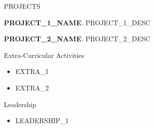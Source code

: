 \documentclass{resume}
\begin{document}
\begin{rSection}{PROJECTS}
\vspace{-1.25em}

\item \textbf{{{PROJECT_1_NAME}}}. {{{PROJECT_1_DESC}}} %

\item \textbf{{{PROJECT_2_NAME}}}. {{{PROJECT_2_DESC}}}

\end{rSection}

\begin{rSection}{Extra-Curricular Activities}

\begin{itemize}
    \item {{{EXTRA_1}}} %
    \item {{{EXTRA_2}}}
\end{itemize}

\end{rSection}

\begin{rSection}{Leadership}

\begin{itemize}
    \item {{{LEADERSHIP_1}}} %
\end{itemize}

\end{rSection}
\end{document}
